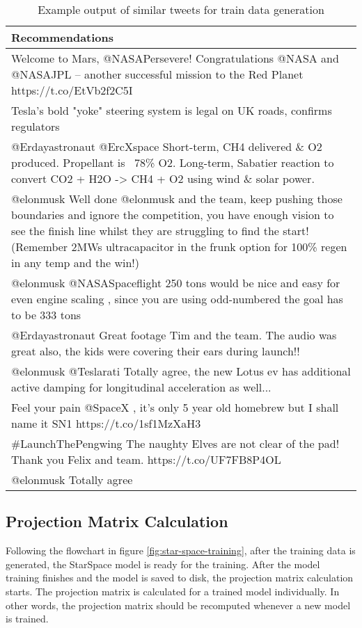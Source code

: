 \begin{table}[!ht]
    \centering
    \caption{Example output of similar tweets for train data generation}
    \label{tab:example-train-data}
    \begin{tabular}{|m{}|}
        \hline
        \textbf{Recommendations} \\
        \hline
        Welcome to Mars, @NASAPersevere! Congratulations @NASA and @NASAJPL – another successful mission to the Red Planet https://t.co/EtVb2f2C5I \\
        \hline
        Tesla’s bold "yoke" steering system is legal on UK roads, confirms regulators \\
        \hline
        @Erdayastronaut @ErcXspace Short-term, CH4 delivered \& O2 produced. Propellant is ~78\% O2. Long-term, Sabatier reaction to convert CO2 + H2O -> CH4 + O2 using wind \& solar power. \\
        \hline
        @elonmusk Well done @elonmusk and the team, keep pushing those boundaries and ignore the competition,  you have enough vision to see the finish line whilst they are struggling to find the start! (Remember 2MWs ultracapacitor in the frunk option for 100\% regen in any temp and the win!) \\
        \hline
        @elonmusk @NASASpaceflight 250 tons would be nice and easy for even engine scaling , since you are using odd-numbered the goal has to be 333 tons \\
        \hline
        @Erdayastronaut Great footage Tim and the team. The audio was great also,  the kids were covering their ears during launch!! \\
        \hline
        @elonmusk @Teslarati Totally agree, the new Lotus ev has additional active damping for longitudinal acceleration as well... \\
        \hline
        Feel your pain @SpaceX , it's only 5 year old homebrew but I shall name it SN1 https://t.co/1sf1MzXaH3 \\
        \hline
        \#LaunchThePengwing The naughty Elves are not clear of the pad! Thank you Felix and team. https://t.co/UF7FB8P4OL \\
        \hline
        @elonmusk Totally agree \\
        \hline
    \end{tabular}
\end{table}


\subsection{Projection Matrix Calculation}
\label{subsec:projection-matrix-calculation}
Following the flowchart in figure \ref{fig:star-space-training}, after the training data is generated, the StarSpace model is ready for the training. After the model training finishes and the model is saved to disk, the projection matrix calculation starts. The projection matrix is calculated for a trained model individually. In other words, the projection matrix should be recomputed whenever a new model is trained.


